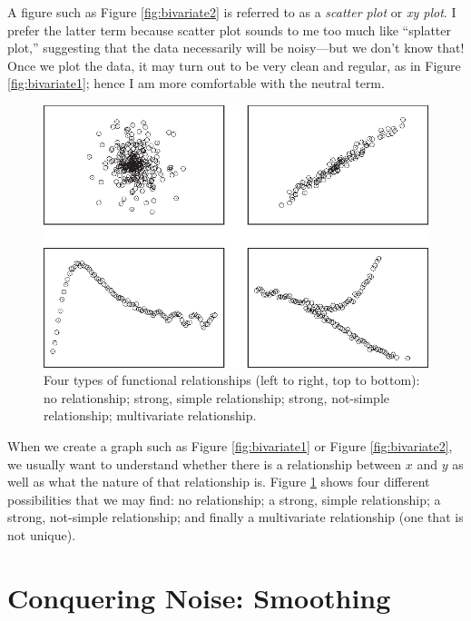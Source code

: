 A figure such as Figure \ref{fig:bivariate2} is referred to as a
\emph{scatter plot} or \emph{xy plot}. I prefer the latter term
because scatter plot sounds to me too much like ``splatter plot,''
suggesting that the data necessarily will be noisy---but we don't know
that!  Once we plot the data, it may turn out to be very clean and
regular, as in Figure \ref{fig:bivariate1}; hence I am more
comfortable with the neutral term.

\begin{figure}[t!]
  \centerline{\includegraphics{img/bivariate3}}
  \caption{Four types of functional relationships (left to right, top
    to bottom): no relationship; strong, simple relationship; strong,
    not-simple relationship; multivariate relationship.}
  \label{fig:bivariate3}\vspace*{12pt}
\end{figure}

When we create a graph such as Figure \ref{fig:bivariate1} or Figure
\ref{fig:bivariate2}, we usually want to understand whether there is a
relationship between $x$ and $y$ as well as what the nature of that
relationship is. Figure \ref{fig:bivariate3} shows four different
possibilities that we may find: no relationship; a strong, simple
relationship; a strong, not-simple relationship; and finally a
multivariate relationship (one that is not unique).

\section{Conquering Noise: Smoothing}

   
